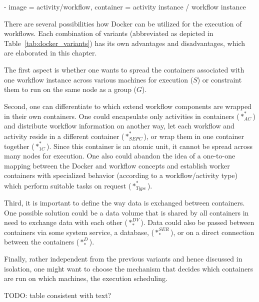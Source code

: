 - image = activity/workflow, container = activity instance / workflow instance

There are several possibilities how Docker can be utilized for the execution of workflows.
Each combination of variants (abbreviated as depicted in Table~\ref{tab:docker_variants}) has its own advantages and disadvantages, which are elaborated in this chapter.

The first aspect is whether one wants to spread the containers associated with one workflow instance across various machines for execution ($S$) or constraint them to run on the same node as a group ($G$).

Second, one can differentiate to which extend workflow components are wrapped in their own containers.
One could encapsulate only activities in containers ($*_{AC}^{*}$) and distribute workflow information on another way, let each workflow and activity reside in a different container ($*_{SEPC}^{*}$), or wrap them in one container together ($*_{1C}^{*}$). Since this container is an atomic unit, it cannot be spread across many nodes for execution. One also could abandon the idea of a one-to-one mapping between the Docker and workflow concepts and establish worker containers with specialized behavior (according to a workflow/activity type) which perform suitable tasks on request ($*_{Type}^{*}$).

Third, it is important to define the way data is exchanged between containers. One possible solution could be a data volume that is shared by all containers in need to exchange data with each other ($*_{*}^{DV}$). Data could also be passed between containers via some system service, \eg a database, ($*_{*}^{SER}$), or on a direct connection between the containers ($*_{*}^{D}$).

Finally, rather independent from the previous variants and hence discussed in isolation, one might want to choose the mechanism that decides which containers are run on which machines, \ie the execution scheduling.

TODO: table consistent with text?

